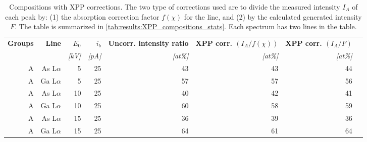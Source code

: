 \begin{table}[phtb]
    \begin{center}
        \caption{
            Compositions with XPP corrections.
            The two type of corrections used are to divide the measured intensity $I_A$ of each peak by: (1) the absorption correction factor $f(\chi)$ for the line, and (2) by the calculated generated intensity $F$.
            The table is summarized in \cref{tab:results:XPP_compositions_stats}.
            Each spectrum has two lines in the table.
        }
        \label{tab:results:XPP_compositions}
        \begin{tabular}{rrrrrrrr}
            \hline
            \textbf{Groups} & \textbf{Line} & \textbf{$E_0$} & \textbf{$i_b$} & \textbf{Uncorr. intensity ratio} & \textbf{XPP corr. $(I_A/f(\chi))$} & \textbf{XPP corr. $(I_A/F)$} \\
            \emph{}         & \emph{}       & \emph{[kV]}    & \emph{[pA]}    & \emph{[at\%]}                    & \emph{[at\%]}                      & \emph{[at\%]}                \\
            \hline
            A               & As L$\alpha$  & 5              & 25             & 43                               & 43                                 & 44                           \\
            A               & Ga L$\alpha$  & 5              & 25             & 57                               & 57                                 & 56                           \\
            A               & As L$\alpha$  & 10             & 25             & 40                               & 42                                 & 41                           \\
            A               & Ga L$\alpha$  & 10             & 25             & 60                               & 58                                 & 59                           \\
            A               & As L$\alpha$  & 15             & 25             & 36                               & 39                                 & 36                           \\
            A               & Ga L$\alpha$  & 15             & 25             & 64                               & 61                                 & 64                           \\

\end{tabular}
\end{center}
\end{table}
